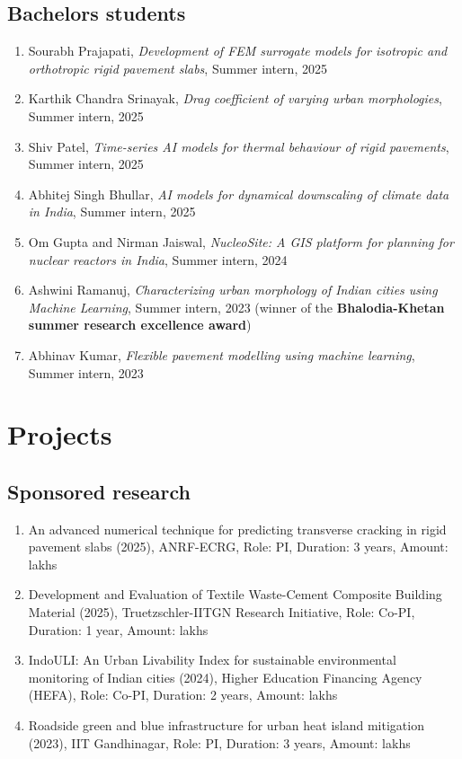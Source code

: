 \documentclass[12pt]{article}
\begin{document}
\subsection*{Bachelors students}
\begin{enumerate}
	\item Sourabh Prajapati, \textit{Development of FEM surrogate models for isotropic and orthotropic rigid pavement slabs}, Summer intern, 2025
	\item Karthik Chandra Srinayak, \textit{Drag coefficient of varying urban morphologies}, Summer intern, 2025
	\item Shiv Patel, \textit{Time-series AI models for thermal behaviour of rigid pavements}, Summer intern, 2025
	\item Abhitej Singh Bhullar, \textit{AI models for dynamical downscaling of climate data in India}, Summer intern, 2025
	\item Om Gupta and Nirman Jaiswal, \textit{NucleoSite: A GIS platform for planning for nuclear reactors in India}, Summer intern, 2024
	\item Ashwini Ramanuj,  \textit{Characterizing urban morphology of Indian cities using Machine Learning}, Summer intern, 2023 (winner of the \textbf{Bhalodia-Khetan summer research excellence award})
	\item Abhinav Kumar, \textit{Flexible pavement modelling using machine learning}, Summer intern, 2023 
\end{enumerate}

\bigskip
\section*{Projects}
\hfill
\subsection*{Sponsored research}
\begin{enumerate}
	\item An advanced numerical technique for predicting transverse cracking in rigid pavement slabs (2025), ANRF-ECRG, Role: PI, Duration: 3 years, Amount:  lakhs
	\item Development and Evaluation of Textile Waste-Cement Composite Building Material (2025), Truetzschler-IITGN Research Initiative, Role: Co-PI, Duration: 1 year, Amount:  lakhs
	\item IndoULI: An Urban Livability Index for sustainable environmental monitoring of Indian cities (2024), Higher Education Financing Agency (HEFA), Role: Co-PI, Duration: 2 years, Amount:  lakhs
	\item Roadside green and blue infrastructure for urban heat island mitigation (2023), IIT Gandhinagar, Role: PI, Duration: 3 years, Amount:  lakhs
\end{enumerate}
\end{document}
